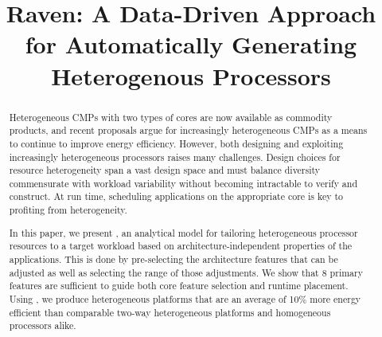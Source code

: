 \documentclass[pageno]{jpaper}
\begin{document}
\title{Raven: A Data-Driven Approach for Automatically Generating Heterogenous Processors}
\date{}
\maketitle

\thispagestyle{empty}

\begin{abstract}
Heterogeneous CMPs with two types of cores are now available as
commodity products, and recent proposals argue for increasingly
heterogeneous CMPs as a means to continue to improve
energy efficiency. However, both designing and exploiting increasingly
heterogeneous processors raises many challenges. Design choices for
resource heterogeneity span a vast design space and must balance
diversity commensurate with workload variability without becoming
intractable to verify and construct. At run time, scheduling
applications on the appropriate core is key to profiting from
heterogeneity.

In this paper, we present \Ravan{}, an analytical model for tailoring
heterogeneous processor resources to a target workload based on
architecture-independent properties of the applications. This is done by
pre-selecting the architecture features that can be adjusted as well as
selecting the range of those adjustments. We show that
8 primary features are sufficient to guide both core feature
selection and runtime placement. Using \Ravan{}, we produce heterogeneous
platforms that are an average of 10\% more energy efficient than comparable
two-way heterogeneous platforms and homogeneous processors alike.
\end{abstract}












\end{document}
